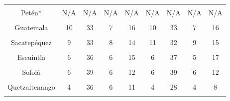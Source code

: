 {\begin{tabular}[t]{ccccccccc}
\cellcolor[HTML]{B6B3FF}{Quiché} & \cellcolor[HTML]{B6B3FF}{8} & \cellcolor[HTML]{B6B3FF}{23} & \cellcolor[HTML]{B6B3FF}{7} & \cellcolor[HTML]{B6B3FF}{16} & \cellcolor[HTML]{B6B3FF}{7} & \cellcolor[HTML]{B6B3FF}{25} & \cellcolor[HTML]{B6B3FF}{7} & \cellcolor[HTML]{B6B3FF}{18}\\
Petén* & N/A & N/A & N/A & N/A & N/A & N/A & N/A & N/A\\
\cellcolor[HTML]{B6B3FF}{DEPARTAMENTO} & \cellcolor[HTML]{B6B3FF}{Mujeres} & \cellcolor[HTML]{B6B3FF}{Hombres} & \cellcolor[HTML]{B6B3FF}{Mujeres} & \cellcolor[HTML]{B6B3FF}{Hombres} & \cellcolor[HTML]{B6B3FF}{Mujeres} & \cellcolor[HTML]{B6B3FF}{Hombres} & \cellcolor[HTML]{B6B3FF}{Mujeres} & \cellcolor[HTML]{B6B3FF}{Hombres}\\
Guatemala & 10 & 33 & 7 & 16 & 10 & 33 & 7 & 16\\
\cellcolor[HTML]{B6B3FF}{El Progreso} & \cellcolor[HTML]{B6B3FF}{6} & \cellcolor[HTML]{B6B3FF}{22} & \cellcolor[HTML]{B6B3FF}{4} & \cellcolor[HTML]{B6B3FF}{12} & \cellcolor[HTML]{B6B3FF}{6} & \cellcolor[HTML]{B6B3FF}{25} & \cellcolor[HTML]{B6B3FF}{7} & \cellcolor[HTML]{B6B3FF}{12}\\
Sacatepéquez & 9 & 33 & 8 & 14 & 11 & 32 & 9 & 15\\
\cellcolor[HTML]{B6B3FF}{Chimaltenango} & \cellcolor[HTML]{B6B3FF}{8} & \cellcolor[HTML]{B6B3FF}{37} & \cellcolor[HTML]{B6B3FF}{13} & \cellcolor[HTML]{B6B3FF}{12} & \cellcolor[HTML]{B6B3FF}{12} & \cellcolor[HTML]{B6B3FF}{34} & \cellcolor[HTML]{B6B3FF}{9} & \cellcolor[HTML]{B6B3FF}{16}\\
Escuintla & 6 & 36 & 6 & 15 & 6 & 37 & 5 & 17\\
\cellcolor[HTML]{B6B3FF}{Santa Rosa} & \cellcolor[HTML]{B6B3FF}{5} & \cellcolor[HTML]{B6B3FF}{34} & \cellcolor[HTML]{B6B3FF}{4} & \cellcolor[HTML]{B6B3FF}{14} & \cellcolor[HTML]{B6B3FF}{4} & \cellcolor[HTML]{B6B3FF}{35} & \cellcolor[HTML]{B6B3FF}{6} & \cellcolor[HTML]{B6B3FF}{13}\\
Sololá & 6 & 39 & 6 & 12 & 6 & 39 & 6 & 12\\
\cellcolor[HTML]{B6B3FF}{Totonicapán} & \cellcolor[HTML]{B6B3FF}{6} & \cellcolor[HTML]{B6B3FF}{26} & \cellcolor[HTML]{B6B3FF}{6} & \cellcolor[HTML]{B6B3FF}{14} & \cellcolor[HTML]{B6B3FF}{5} & \cellcolor[HTML]{B6B3FF}{26} & \cellcolor[HTML]{B6B3FF}{6} & \cellcolor[HTML]{B6B3FF}{14}\\
Quetzaltenango & 4 & 36 & 6 & 11 & 4 & 28 & 4 & 8\\
\cellcolor[HTML]{B6B3FF}{Suchitepéquez} & \cellcolor[HTML]{B6B3FF}{18} & \cellcolor[HTML]{B6B3FF}{52} & \cellcolor[HTML]{B6B3FF}{18} & \cellcolor[HTML]{B6B3FF}{26} & \cellcolor[HTML]{B6B3FF}{13} & \cellcolor[HTML]{B6B3FF}{48} & \cellcolor[HTML]{B6B3FF}{13} & \cellcolor[HTML]{B6B3FF}{25}\\

\end{tabular}}
